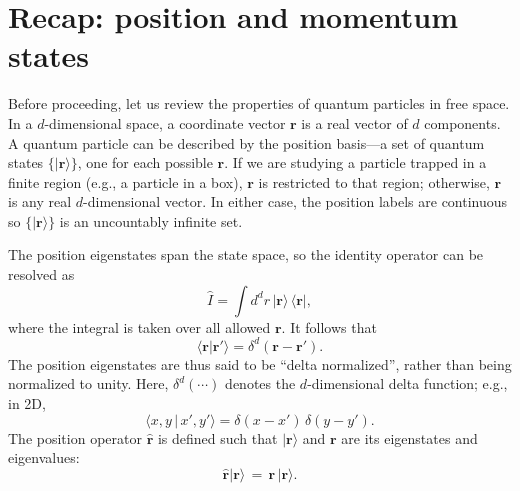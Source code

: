 \documentclass[pra,12pt]{revtex4}
\begin{document}
\section{Recap: position and momentum states}
\label{sec:waves}

Before proceeding, let us review the properties of quantum particles
in free space.  In a $d$-dimensional space, a coordinate vector
$\mathbf{r}$ is a real vector of $d$ components.  A quantum particle
can be described by the position basis---a set of quantum states
$\{|\mathbf{r}\rangle\}$, one for each possible $\mathbf{r}$.  If we
are studying a particle trapped in a finite region (e.g., a particle
in a box), $\mathbf{r}$ is restricted to that region; otherwise,
$\mathbf{r}$ is any real $d$-dimensional vector.  In either case, the
position labels are continuous so $\{|\mathbf{r}\rangle\}$ is an
uncountably infinite set.

The position eigenstates span the state space, so the identity
operator can be resolved as
\begin{equation}
  \hat{I} = \int d^dr \, |\mathbf{r}\rangle \,\langle\mathbf{r}|,
\end{equation}
where the integral is taken over all allowed $\mathbf{r}$.  It
follows that
\begin{equation}
  \langle \mathbf{r} | \mathbf{r}' \rangle = \delta^d(\mathbf{r}-\mathbf{r}').
\end{equation}
The position eigenstates are thus said to be ``delta normalized'',
rather than being normalized to unity.  Here, $\delta^d(\cdots)$
denotes the $d$-dimensional delta function; e.g., in 2D,
\begin{equation*}
  \langle x,y \,|\, x',y' \rangle = \delta(x-x') \, \delta(y-y').
\end{equation*}
The position operator $\hat{\mathbf{r}}$ is defined such that
$|\mathbf{r}\rangle$ and $\mathbf{r}$ are its eigenstates and
eigenvalues:
\begin{equation}
  \hat{\mathbf{r}} |\mathbf{r}\rangle \,=\, \mathbf{r}\, |\mathbf{r}\rangle.
\end{equation}
\end{document}
